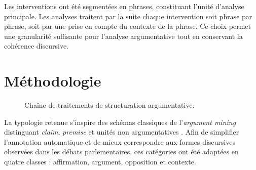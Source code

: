 \documentclass[final, fra]{anthology-ch}      %
\begin{document}
Les interventions ont été segmentées en phrases, constituant l’unité d’analyse principale. Les analyses traitent par la suite chaque intervention soit phrase par phrase, soit par une prise en compte du contexte de la phrase. Ce choix permet une granularité suffisante pour l’analyse argumentative tout en conservant la cohérence discursive.


\section{Méthodologie}

\begin{figure}
\centering\vspace{-.3cm}

\caption{Chaîne de traitements de structuration argumentative.}
\label{fig:pipeline}
\vspace{-.5cm}
\end{figure}

La typologie retenue s’inspire des schémas classiques de l’\textit{argument mining} distinguant \textit{claim}, \textit{premise} et unités non argumentatives \cite{lippi2016,peldszus2015}. Afin de simplifier l’annotation automatique et de mieux correspondre aux formes discursives observées dans les débats parlementaires, ces catégories ont été adaptées en quatre classes : affirmation, argument, opposition et contexte.
\end{document}
